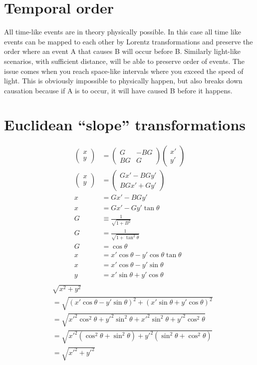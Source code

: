 \documentclass[11pt,letterpaper, twocolumn]{article}
\begin{document}
\section{Temporal order}
All time-like events are in theory physically possible. In this case all time like events can be mapped to each other by Lorentz transformations and preserve the order where an event A that causes B will occur before B. Similarly light-like scenarios, with sufficient distance, will be able to preserve order of events. The issue comes when you reach space-like intervals where you exceed the speed of light. This is obviously impossible to physically happen, but also breaks down causation because if A is to occur, it will have caused B before it happens. 

\section{Euclidean “slope” transformations}
\begin{align*}
    \begin{pmatrix}x\\y\end{pmatrix} &= \begin{pmatrix}G&-BG\\BG&G\end{pmatrix}\begin{pmatrix}x'\\y'\end{pmatrix}\\
    \begin{pmatrix}x\\y\end{pmatrix}&=\begin{pmatrix}Gx' - BGy' \\ BGx'+Gy'\end{pmatrix}\\
    x&=Gx' - BGy'\\
    x&=Gx' - Gy'\tan\theta\\
    G & \equiv \frac{1}{\sqrt{1+B^2}}\\
    G &= \frac{1}{\sqrt{1+\tan^2\theta}}\\
    G &= \cos\theta\\
    x&=x'\cos\theta - y'\cos\theta\tan\theta\\
    x&=x'\cos\theta - y'\sin\theta\\
    y&=x'\sin\theta+y'\cos\theta\\
\end{align*}
\begin{align*}
    &\sqrt{x^2+y^2}\\
    &=\sqrt{(x'\cos\theta - y'\sin\theta)^2+(x'\sin\theta+y'\cos\theta)^2}\\
    &=\sqrt{x'^2\cos^2\theta + y'^2\sin^2\theta +x'^2\sin^2\theta+y'^2\cos^2\theta}\\
    &=\sqrt{x'^2(\cos^2\theta + \sin^2\theta) + y'^2(\sin^2\theta +\cos^2\theta)}\\
    &=\sqrt{x'^2+ y'^2}\\
\end{align*}
\end{document}
